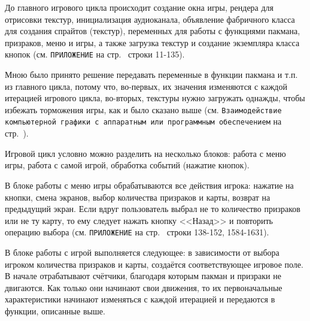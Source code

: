 До главного игрового цикла происходит создание окна игры, рендера для отрисовки текстур, инициализация аудиоканала, объявление фабричного класса для создания спрайтов (текстур), переменных для работы с функциями пакмана, призраков, меню и игры, а также загрузка текстур и создание экземпляра класса кнопок (см. \texttt{ПРИЛОЖЕНИЕ} на стр.~\pageref{code:main} строки 11-135).

Мною было принято решение передавать переменные в функции пакмана и т.п. из главного цикла, потому что, во-первых, их значения изменяются с каждой итерацией игрового цикла, во-вторых, текстуры нужно загружать однажды, чтобы избежать торможения игры, как и было сказано выше (см. \texttt{Взаимодействие компьютерной графики с аппаратным или программным обеспечением} на стр.~\pageref{subsec:ch02/sec01/sub02}).

Игровой цикл условно можно разделить на несколько блоков: работа с меню игры, работа с самой игрой, обработка событий (нажатие кнопок). 

В блоке работы с меню игры обрабатываются все действия игрока: нажатие на кнопки, смена экранов, выбор количества призраков и карты, возврат на предыдущий экран. Если вдруг пользователь выбрал не то количество призраков или не ту карту, то ему следует нажать кнопку <<Назад>> и повторить операцию выбора (см. \texttt{ПРИЛОЖЕНИЕ} на стр.~\pageref{code:main} строки 138-152, 1584-1631). 

В блоке работы с игрой выполняется следующее: в зависимости от выбора игроком количества призраков и карты, создаётся соответствующее игровое поле. В начале отрабатывают счётчики, благодаря которым пакман и призраки не двигаются. Как только они начинают свои движения, то их первоначальные характеристики начинают изменяться с каждой итерацией и передаются в функции, описанные выше. 


